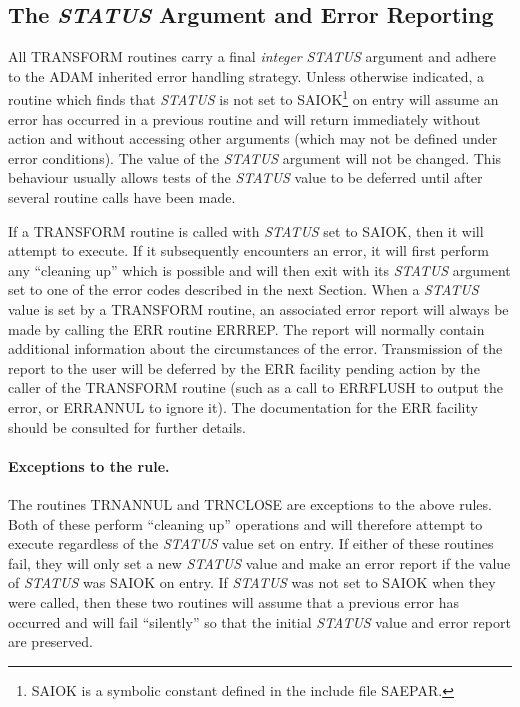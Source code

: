 \documentclass[twoside,11pt]{article}
\newcommand{\xlabel}[1]{}
\renewcommand{\_}{\texttt{\symbol{95}}}
\newcommand{\name}[1]{\mbox{\small{#1}}}
\newcommand{\fortvar}[1]{\mbox{\emph{#1}}}
\begin{document}
\label{appendix:error}


\subsection{\xlabel{the_status_argument_and_error_reporting}%
The \fortvar{STATUS} Argument and Error Reporting}

All \name{TRANSFORM} routines carry a final \emph{integer} \fortvar{STATUS}
argument and adhere to the \name{ADAM} inherited error handling strategy.
Unless otherwise indicated, a routine which finds that \fortvar{STATUS} is
not set to \name{SAI\_\_OK}\footnote{
\name{SAI\_\_OK} is a symbolic constant defined in the include file
\name{SAE\_PAR}.
}
on entry will assume an error has occurred in a previous routine and will
return immediately without action and without accessing other arguments
(which may not be defined under error conditions).
The value of the \fortvar{STATUS} argument will not be changed.
This behaviour usually allows tests of the \fortvar{STATUS} value to be
deferred until after several routine calls have been made.

If a \name{TRANSFORM} routine is called with \fortvar{STATUS} set to
\name{SAI\_\_OK}, then it will attempt to execute.
If it subsequently encounters an error, it will first perform any ``cleaning
up'' which is possible and will then exit with its \fortvar{STATUS} argument
set to one of the error codes described in the next Section.
When a \fortvar{STATUS} value is set by a \name{TRANSFORM} routine, an
associated error report will always be made by calling the \name{ERR}
routine \name{ERR\_REP}.
The report will normally contain additional information about the
circumstances of the error.
Transmission of the report to the user will be deferred by the \name{ERR}
facility pending action by the caller of the \name{TRANSFORM} routine
(such as a call to \name{ERR\_FLUSH} to output the error, or
\name{ERR\_ANNUL} to ignore it).
The documentation for the \name{ERR} facility should be consulted for
further details.

\paragraph{Exceptions to the rule.}
The routines \name{TRN\_ANNUL} and \name{TRN\_CLOSE} are exceptions to the
above rules.
Both of these perform ``cleaning up'' operations and will therefore attempt
to execute regardless of the \fortvar{STATUS} value set on entry.
If either of these routines fail, they will only set a new \fortvar{STATUS}
value and make an error report if the value of \fortvar{STATUS} was
\name{SAI\_\_OK} on entry.
If \fortvar{STATUS} was not set to \name{SAI\_\_OK} when they were called,
then these two routines will assume that a previous error has occurred and
will fail ``silently'' so that the initial \fortvar{STATUS} value and error
report are preserved.
\end{document}
